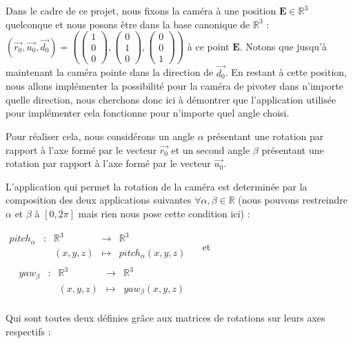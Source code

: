 Dans le cadre de ce projet, nous fixons la caméra à une position $\mathbf{E} \in \mathbb{R}^3$ quelconque et nous posons être dans la base canonique de $\mathbb{R}^3$ : $(\vec{r_0}, \vec{u_0}, \vec{d_0}) =
\left(
\left( \begin{smallmatrix} 1 \\ 0 \\ 0 \end{smallmatrix} \right),
\left( \begin{smallmatrix} 0 \\ 1 \\ 0 \end{smallmatrix} \right),
\left( \begin{smallmatrix} 0 \\ 0 \\ 1 \end{smallmatrix} \right)
\right)$ à ce point $\mathbf{E}$. Notons que jusqu'à maintenant la caméra pointe dans la direction de $\vec{d_0}$. En restant à cette position, nous allons implémenter la possibilité pour la caméra de pivoter dans n'importe quelle direction, nous cherchons donc ici à démontrer que l'application utilisée pour implémenter cela fonctionne pour n'importe quel angle choisi.

Pour réaliser cela, nous considérons un angle $\alpha$ présentant une rotation par rapport à l'axe formé par le vecteur $\vec{r_0}$ et un second angle $\beta$ présentant une rotation par rapport à l'axe formé par le vecteur $\vec{u_0}$.

L'application qui permet la rotation de la caméra est determinée par la composition des deux applications suivantes $\forall \alpha, \beta \in \mathbb{R}$ (nous pouvons restreindre $\alpha$ et $\beta$ à $[0, 2\pi]$ mais rien nous pose cette condition ici) :

$\begin{array}{ccccc}
pitch_\alpha & : & \mathbb{R}^3 & \to & \mathbb{R}^3 \\
 & & (x, y, z) & \mapsto & pitch_\alpha (x, y, z) \\
\end{array}
\quad$ et $\quad
\begin{array}{ccccc}
yaw_\beta & : & \mathbb{R}^3 & \to & \mathbb{R}^3 \\
 & & (x, y, z) & \mapsto & yaw_\beta (x, y, z) \\
\end{array}$

Qui sont toutes deux définies grâce aux matrices de rotations sur leurs axes respectifs :

